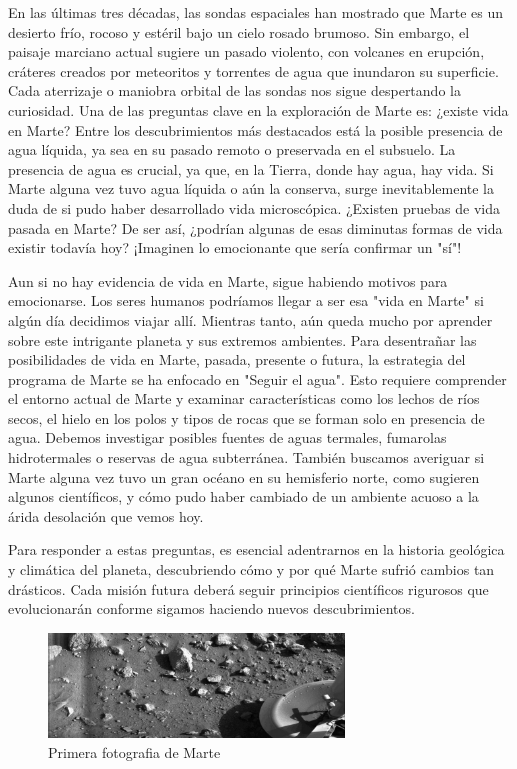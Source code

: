 \documentclass[a4paper]{article}
\begin{document}
En las últimas tres décadas, las sondas espaciales han mostrado que Marte es un desierto frío, rocoso y estéril bajo un cielo rosado brumoso. Sin embargo, el paisaje marciano actual sugiere un pasado violento, con volcanes en erupción, cráteres creados por meteoritos y torrentes de agua que inundaron su superficie. Cada aterrizaje o maniobra orbital de las sondas nos sigue despertando la curiosidad. Una de las preguntas clave en la exploración de Marte es: ¿existe vida en Marte? Entre los descubrimientos más destacados está la posible presencia de agua líquida, ya sea en su pasado remoto o preservada en el subsuelo. La presencia de agua es crucial, ya que, en la Tierra, donde hay agua, hay vida. Si Marte alguna vez tuvo agua líquida o aún la conserva, surge inevitablemente la duda de si pudo haber desarrollado vida microscópica. ¿Existen pruebas de vida pasada en Marte? De ser así, ¿podrían algunas de esas diminutas formas de vida existir todavía hoy? ¡Imaginen lo emocionante que sería confirmar un "sí"!

Aun si no hay evidencia de vida en Marte, sigue habiendo motivos para emocionarse. Los seres humanos podríamos llegar a ser esa "vida en Marte" si algún día decidimos viajar allí. Mientras tanto, aún queda mucho por aprender sobre este intrigante planeta y sus extremos ambientes. Para desentrañar las posibilidades de vida en Marte, pasada, presente o futura, la estrategia del programa de Marte se ha enfocado en "Seguir el agua". Esto requiere comprender el entorno actual de Marte y examinar características como los lechos de ríos secos, el hielo en los polos y tipos de rocas que se forman solo en presencia de agua. Debemos investigar posibles fuentes de aguas termales, fumarolas hidrotermales o reservas de agua subterránea. También buscamos averiguar si Marte alguna vez tuvo un gran océano en su hemisferio norte, como sugieren algunos científicos, y cómo pudo haber cambiado de un ambiente acuoso a la árida desolación que vemos hoy.

Para responder a estas preguntas, es esencial adentrarnos en la historia geológica y climática del planeta, descubriendo cómo y por qué Marte sufrió cambios tan drásticos. Cada misión futura deberá seguir principios científicos rigurosos que evolucionarán conforme sigamos haciendo nuevos descubrimientos.








\begin{figure}
\centering
\includegraphics[width=0.7\textwidth]{fotoMarte.jpeg}
\caption{\label{fig:frog} Primera fotografia de Marte}
\end{figure}
\end{document}
